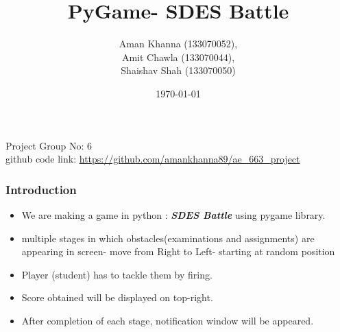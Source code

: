 \documentclass[]{beamer}
\title{PyGame- SDES Battle}    %
\author{Aman Khanna (133070052),\\
Amit Chawla (133070044),\\
Shaishav Shah (133070050)
}                 %
\institute{
IIT Bombay}      %
\date{\today}                    %
\begin{document}
\begin{frame}
  \titlepage
  \begin{center}
      Project Group No: 6\\
      github code link: \url{https://github.com/amankhanna89/ae_663_project}
  \end{center}

\end{frame}


\begin{frame}
  \frametitle{Introduction}
  \begin{center}
  \begin{itemize}
    \item We  are making a game in python : \textbf{\textit{SDES Battle}} using pygame library.
    \item multiple stages in which obstacles(examinations and assignments)
 are appearing in screen- move from Right to Left- starting at random position
    \item Player (student) has to tackle them by firing.
    \item Score obtained will be displayed on top-right.
    \item After completion of each stage, notification window will be appeared.
  \end{itemize}
   
  \end{center}

  
  \end{frame}
\end{document}
